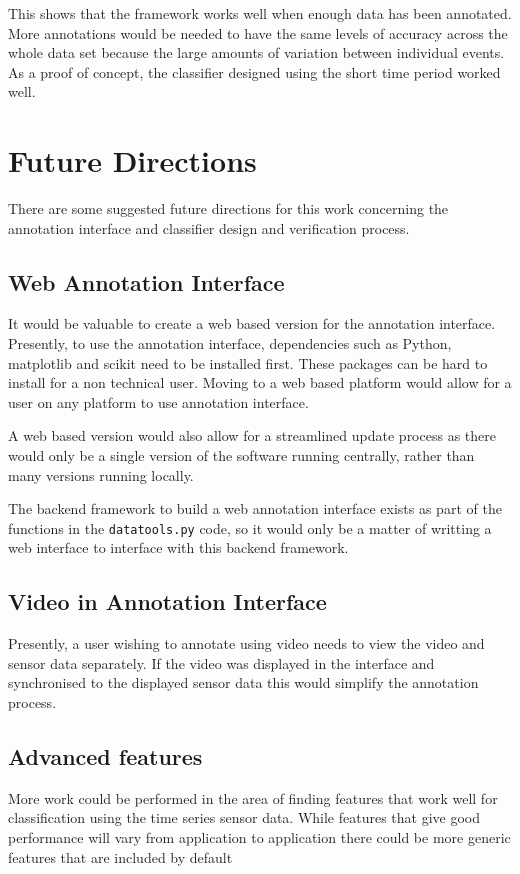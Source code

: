 
This shows that the framework works well when enough data has been annotated. More annotations would be needed to have the same levels of accuracy across the whole data set because the large amounts of variation between individual events. As a proof of concept, the classifier designed using the short time period worked well. 


\section{Future Directions}

There are some suggested future directions for this work concerning the annotation interface and classifier design and verification process.

\subsection{Web Annotation Interface}
It would be valuable to create a web based version for the annotation interface. Presently, to use the annotation interface, dependencies such as Python, matplotlib and scikit need to be installed first. These packages can be hard to install for a non technical user. Moving to a web based platform would allow for a user on any platform to use annotation interface. 

A web based version would also allow for a streamlined update process as there would only be a single version of the software running centrally, rather than many versions running locally.

The backend framework to build a web annotation interface exists as part of the functions in the \texttt{datatools.py} code, so it would only be a matter of writting a web interface to interface with this backend framework. 

\subsection{Video in Annotation Interface}
Presently, a user wishing to annotate using video needs to view the video and sensor data separately. If the video was displayed in the interface and synchronised to the displayed sensor data this would simplify the annotation process. 

\subsection{Advanced features}
More work could be performed in the area of finding features that work well for classification using the time series sensor data. While features that give good performance will vary from application to application there could be more generic features that are included by default 






